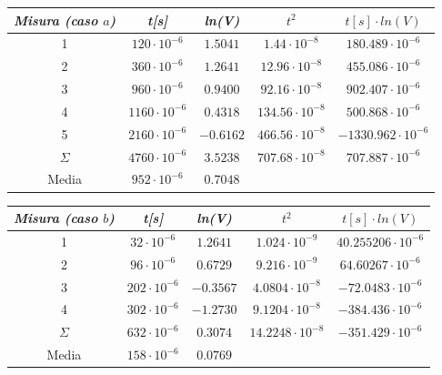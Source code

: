     \begin{center}
    \begin{tabular}{|c|c|c|c|c|}
        \hline
        \textit{Misura (caso $a$)} & \textit{t[s]} & \textit{ln(V)} & \textit{$t^2$} & \textit{$t[s] \cdot ln(V)$} \\
        \hline
        1 & $120 \cdot 10^{-6}$ & $1.5041$ & $1.44 \cdot 10^{-8}$ & $180.489 \cdot 10^{-6}$ \\
        \hline
        2 & $360 \cdot 10^{-6}$ & $1.2641$ & $12.96 \cdot 10^{-8}$ & $455.086 \cdot 10^{-6}$ \\
        \hline
        3 & $960 \cdot 10^{-6}$ & $0.9400$ & $92.16 \cdot 10^{-8}$ & $902.407 \cdot 10^{-6}$ \\
        \hline
        4 & $1160 \cdot 10^{-6}$ & $0.4318$ & $134.56 \cdot 10^{-8}$ & $500.868 \cdot 10^{-6}$ \\
        \hline
        5 & $2160 \cdot 10^{-6}$ & $-0.6162$ & $466.56 \cdot 10^{-8}$ & $-1330.962 \cdot 10^{-6}$ \\
        \hline
        $\varSigma$ & $4760 \cdot 10^{-6}$ & $3.5238$ & $707.68 \cdot 10^{-8}$ & $707.887 \cdot 10^{-6}$ \\
        \hline
        Media & $952 \cdot 10^{-6}$ & $0.7048$ & \multicolumn{2}{c}{} \\
        \hline
    \end{tabular}
    \begin{tabular}{|c|c|c|c|c|}
        \hline
        \textit{Misura (caso $b$)} & \textit{t[s]} & \textit{ln(V)} & \textit{$t^2$} & \textit{$t[s] \cdot ln(V)$} \\
        \hline
        1 & $32 \cdot 10^{-6}$ & $1.2641$ & $1.024 \cdot 10^{-9}$ & $40.255206 \cdot 10^{-6}$ \\
        \hline
        2 & $96 \cdot 10^{-6}$ & $0.6729$ & $9.216 \cdot 10^{-9}$ & $64.60267 \cdot 10^{-6}$ \\
        \hline
        3 & $202 \cdot 10^{-6}$ & $-0.3567$ & $4.0804 \cdot 10^{-8}$ & $-72.0483 \cdot 10^{-6}$ \\
        \hline
        4 & $302 \cdot 10^{-6}$ & $-1.2730$ & $9.1204 \cdot 10^{-8}$ & $-384.436 \cdot 10^{-6}$ \\
        \hline
        $\varSigma$ & $632 \cdot 10^{-6}$ & $0.3074$ & $14.2248 \cdot 10^{-8}$ & $-351.429 \cdot 10^{-6}$ \\
        \hline
        Media & $158 \cdot 10^{-6}$ & $0.0769$ & \multicolumn{2}{c}{} \\
        \hline
    \end{tabular}

\end{center}
